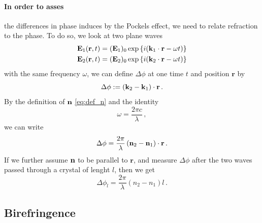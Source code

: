 \paragraph{In order to asses} 
the differences in phase induces by the Pockels effect, we need to 
relate refraction to the phase. To do so, we look at two plane waves  
\begin{align}
\mathbf{E}_1(\mathbf{r}, t) = (\mathbf{E}_1)_0 \exp\left\{i(\mathbf{k}_1 \cdot \mathbf{r} - \omega t) \right\} \\ 
\mathbf{E}_2(\mathbf{r}, t) = (\mathbf{E}_2)_0 \exp\left\{i(\mathbf{k}_2 \cdot \mathbf{r} - \omega t) \right\} \\ 
\end{align}
with the same frequency $\omega$,
we can define $\Delta \phi$ at 
one time $t$ and position $\mathbf{r}$ by 
\begin{equation}
    \Delta \phi := \left(\mathbf{k}_2 - \mathbf{k}_1 \right) \cdot \mathbf{r}\, .
\end{equation}
By the definition of $\mathbf{n}$ \eqref{eq:def_n} and the identity 
\begin{equation}
    \omega = \frac{2 \pi c}{\lambda} \, ,
\end{equation}
we can write 
\begin{equation}
    \Delta \phi = \frac{2 \pi}{\lambda} 
    \left(\mathbf{n}_2 - \mathbf{n}_1 \right) \cdot \mathbf{r} \, .
\end{equation}
If we further assume $\mathbf{n}$ to be parallel to $\mathbf{r}$, 
and measure $\Delta \phi$ after the two waves passed 
through a crystal of lenght $l$, then we get
\begin{equation}
    \Delta \phi_l = \frac{2 \pi}{\lambda} 
    \left(n_2 - n_1 \right) l \, .
    \label{eq:dphi}
\end{equation}



\subsection{Birefringence}
